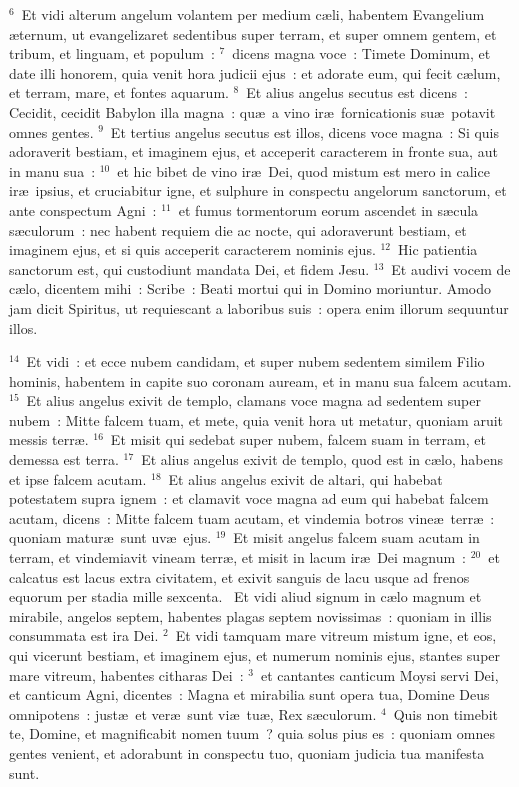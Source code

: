 ${}^{6}$~Et vidi alterum angelum volantem per medium c\ae li, habentem Evangelium \ae ternum, ut evangelizaret sedentibus super terram, et super omnem gentem, et tribum, et linguam, et populum~:
${}^{7}$~dicens magna voce~: Timete Dominum, et date illi honorem, quia venit hora judicii ejus~: et adorate eum, qui fecit c\ae lum, et terram, mare, et fontes aquarum.
${}^{8}$~Et alius angelus secutus est dicens~: Cecidit, cecidit Babylon illa magna~: qu\ae\ a vino ir\ae\ fornicationis su\ae\ potavit omnes gentes.
${}^{9}$~Et tertius angelus secutus est illos, dicens voce magna~: Si quis adoraverit bestiam, et imaginem ejus, et acceperit caracterem in fronte sua, aut in manu sua~:
${}^{10}$~et hic bibet de vino ir\ae\ Dei, quod mistum est mero in calice ir\ae\ ipsius, et cruciabitur igne, et sulphure in conspectu angelorum sanctorum, et ante conspectum Agni~:
${}^{11}$~et fumus tormentorum eorum ascendet in s\ae cula s\ae culorum~: nec habent requiem die ac nocte, qui adoraverunt bestiam, et imaginem ejus, et si quis acceperit caracterem nominis ejus.
${}^{12}$~Hic patientia sanctorum est, qui custodiunt mandata Dei, et fidem Jesu.
${}^{13}$~Et audivi vocem de c\ae lo, dicentem mihi~: Scribe~: Beati mortui qui in Domino moriuntur. Amodo jam dicit Spiritus, ut requiescant a laboribus suis~: opera enim illorum sequuntur illos.


${}^{14}$~Et vidi~: et ecce nubem candidam, et super nubem sedentem similem Filio hominis, habentem in capite suo coronam auream, et in manu sua falcem acutam.
${}^{15}$~Et alius angelus exivit de templo, clamans voce magna ad sedentem super nubem~: Mitte falcem tuam, et mete, quia venit hora ut metatur, quoniam aruit messis terr\ae .
${}^{16}$~Et misit qui sedebat super nubem, falcem suam in terram, et demessa est terra.
${}^{17}$~Et alius angelus exivit de templo, quod est in c\ae lo, habens et ipse falcem acutam.
${}^{18}$~Et alius angelus exivit de altari, qui habebat potestatem supra ignem~: et clamavit voce magna ad eum qui habebat falcem acutam, dicens~: Mitte falcem tuam acutam, et vindemia botros vine\ae\ terr\ae~: quoniam matur\ae\ sunt uv\ae\ ejus.
${}^{19}$~Et misit angelus falcem suam acutam in terram, et vindemiavit vineam terr\ae , et misit in lacum ir\ae\ Dei magnum~:
${}^{20}$~et calcatus est lacus extra civitatem, et exivit sanguis de lacu usque ad frenos equorum per stadia mille sexcenta.
~Et vidi aliud signum in c\ae lo magnum et mirabile, angelos septem, habentes plagas septem novissimas~: quoniam in illis consummata est ira Dei.
${}^{2}$~Et vidi tamquam mare vitreum mistum igne, et eos, qui vicerunt bestiam, et imaginem ejus, et numerum nominis ejus, stantes super mare vitreum, habentes citharas Dei~:
${}^{3}$~et cantantes canticum Moysi servi Dei, et canticum Agni, dicentes~: Magna et mirabilia sunt opera tua, Domine Deus omnipotens~: just\ae\ et ver\ae\ sunt vi\ae\ tu\ae , Rex s\ae culorum.
${}^{4}$~Quis non timebit te, Domine, et magnificabit nomen tuum~? quia solus pius es~: quoniam omnes gentes venient, et adorabunt in conspectu tuo, quoniam judicia tua manifesta sunt.



